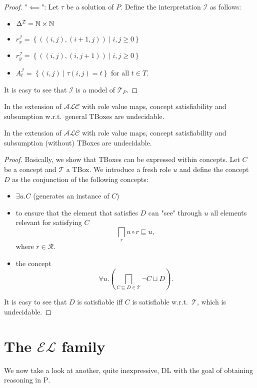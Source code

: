 \begin{proof}
	"$ \impliedby$":
	Let $\tau$ be a solution of $P$.
	Define the interpretation $\mathcal{I}$ as follows:
	\begin{itemize}
		\item $\Delta^\mathcal{I} = \mathbb{N} \times \mathbb{N}$
		\item $r_x^\mathcal{I} = \left\{ \left( (i,j), (i+1, j) \right) \mid i,j \geq 0 \right\}$
		\item $r_y^\mathcal{I} = \left\{ \left( (i,j), (i, j+1) \right) \mid i,j \geq 0 \right\}$
		\item $A_t^\mathcal{I} = \left\{ (i,j) \mid \tau(i,j) = t \right\}$ for all $t \in T$.
	\end{itemize}
	It is easy to see that $\mathcal{I}$ is a model of $\mathcal{T}_P$.
\end{proof}

\begin{theorem}
	In the extension of $\mathcal{ALC}$ with role value maps, concept satisfiability and subsumption w.r.t.\ general TBoxes are undecidable.
\end{theorem}
\begin{theorem}
	In the extension of $\mathcal{ALC}$ with role value maps, concept satisfiability and subsumption (without) TBoxes are undecidable.
\end{theorem}
\begin{proof}
	Basically, we show that TBoxes can be expressed within concepts.
	Let $C$ be a concept and $\mathcal{T}$ a TBox.
	We introduce a fresh role $u$ and define the concept $D$ as the conjunction of the following concepts:
	\begin{itemize}
		\item $\exists u.C$ (generates an instance of $C$)
		\item to ensure that the element that satisfies $D$
			can "see" through $u$ all elements relevant for satisfying $C$
			\[
				\bigsqcap_{r} u \circ r\sqsubseteq u
			,\]
			where $r \in \mathscr{R}$.
		\item the concept \[
				\forall u.\left( \bigsqcap_{C \sqsubseteq D \in \mathcal{T}} \neg C \sqcup D \right)
			.\]
	\end{itemize}
	It is easy to see that $D$ is satisfiable iff $C$ is satisfiable w.r.t.\ $\mathcal{T}$, which is undecidable.
\end{proof}

\chapter{The $\mathcal{EL}$ family}
We now take a look at another, quite inexpressive, DL with the goal of obtaining reasoning in \textsc{P}.

